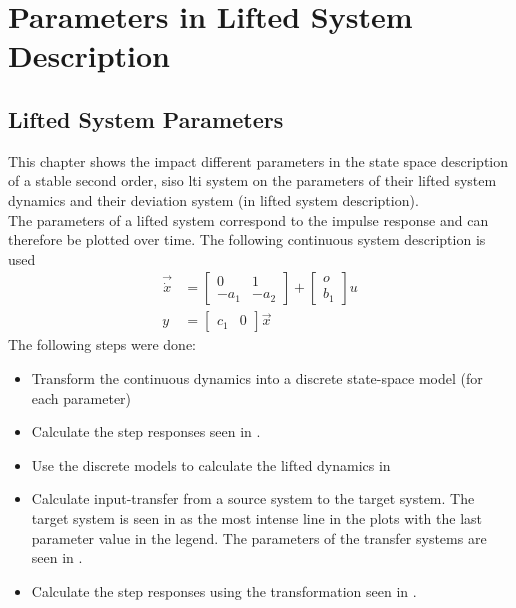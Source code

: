 \chapter{Parameters in Lifted System Description}
\graphicspath{{./Bilder/appendix/lifted_system_parameters}} 

\section{Lifted System Parameters}
This chapter shows the impact different parameters in the state space description of a stable second order, \gls{siso} \gls{lti} system on the parameters of their lifted system dynamics and their deviation system (in lifted system description).\\
The parameters of a lifted system correspond to the impulse response and can therefore be plotted over time. 
The following continuous system description is used
\begin{align}
	\vec{\dot x} &= \begin{bmatrix}
		0 & 1 \\
		-a_1 & -a_2
	\end{bmatrix} + 
	\begin{bmatrix}
		o \\ b_1
	\end{bmatrix} u\\
	y &= \begin{bmatrix}
		c_1 & 0
	\end{bmatrix} \vec{x}
\end{align}
The following steps were done:
\vspace{-0.5em}
\begin{itemize}[noitemsep, topsep=0pt]
    \item Transform the continuous dynamics into a discrete state-space model (for each parameter)
    \item Calculate the step responses seen in .
    \item Use the discrete models to calculate the lifted dynamics in 
    \item Calculate input-transfer from a source system to the target system. The target system is seen in  as the most intense line in the plots with the last parameter value in the legend. The parameters of the transfer systems are seen in .
    \item  Calculate the step responses using the transformation seen in .
\end{itemize}

